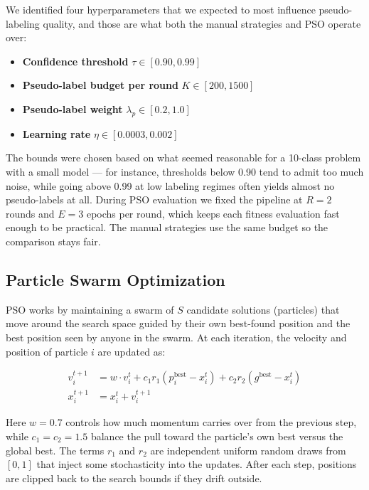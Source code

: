 \documentclass[journal]{IEEEtran}
\begin{document}
We identified four hyperparameters that we expected to most influence
pseudo-labeling quality, and those are what both the manual strategies and
PSO operate over:

\begin{itemize}
    \item \textbf{Confidence threshold} $\tau \in [0.90, 0.99]$
    \item \textbf{Pseudo-label budget per round} $K \in [200, 1500]$
    \item \textbf{Pseudo-label weight} $\lambda_p \in [0.2, 1.0]$
    \item \textbf{Learning rate} $\eta \in [0.0003, 0.002]$
\end{itemize}

The bounds were chosen based on what seemed reasonable for a 10-class problem
with a small model --- for instance, thresholds below 0.90 tend to admit too
much noise, while going above 0.99 at low labeling regimes often yields almost
no pseudo-labels at all. During PSO evaluation we fixed the pipeline at $R = 2$
rounds and $E = 3$ epochs per round, which keeps each fitness evaluation fast
enough to be practical. The manual strategies use the same budget so the
comparison stays fair.

\subsection{Particle Swarm Optimization}

PSO works by maintaining a swarm of $S$ candidate solutions (particles) that
move around the search space guided by their own best-found position and the
best position seen by anyone in the swarm. At each iteration, the velocity and
position of particle $i$ are updated as:

\begin{align}
v_i^{t+1} &= w \cdot v_i^t
            + c_1 r_1 (p_i^{\text{best}} - x_i^t)
            + c_2 r_2 (g^{\text{best}} - x_i^t) \label{eq:vel} \\
x_i^{t+1} &= x_i^t + v_i^{t+1} \label{eq:pos}
\end{align}

Here $w = 0.7$ controls how much momentum carries over from the previous
step, while $c_1 = c_2 = 1.5$ balance the pull toward the particle's own best
versus the global best. The terms $r_1$ and $r_2$ are independent uniform
random draws from $[0, 1]$ that inject some stochasticity into the updates.
After each step, positions are clipped back to the search bounds if they drift
outside.
\end{document}
